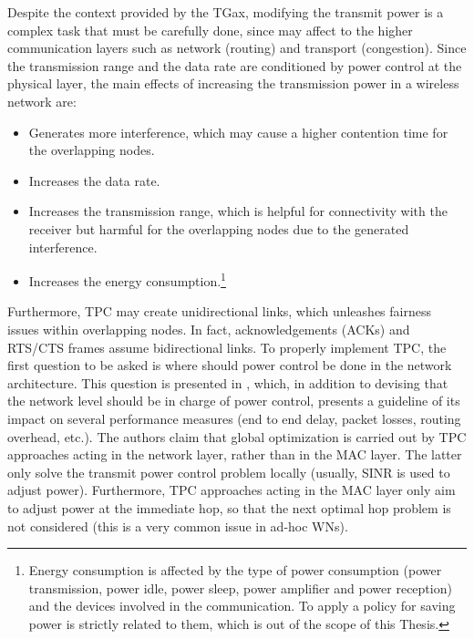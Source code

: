 \documentclass[12pt, a4paper,twoside]{tesi_upf}
\begin{document}
				Despite the context provided by the TGax, modifying the transmit power is a complex task that must be carefully done, since may affect to the higher communication layers such as network (routing) and transport (congestion). Since the transmission range and the data rate are conditioned by power control at the physical layer, the main effects of increasing the transmission power in a wireless network are:
				\begin{itemize}
					\item Generates more interference, which may cause a higher contention time for the overlapping nodes.
					\item Increases the data rate.
					\item Increases the transmission range, which is helpful for connectivity with the receiver but harmful for the overlapping nodes due to the generated interference.
					\item Increases the energy consumption.\footnote{Energy consumption is affected by the type of power consumption (power transmission, power idle, power sleep, power amplifier and power reception) and the devices involved in the communication. To apply a policy for saving power is strictly related to them, which is out of the scope of this Thesis.}
				\end{itemize}
				
				Furthermore, TPC may create unidirectional links, which unleashes fairness issues within overlapping nodes. In fact, acknowledgements (ACKs) and RTS/CTS frames assume bidirectional links. To properly implement TPC, the first question to be asked is where should power control be done in the network architecture. This question is presented in \cite{kawadia2005principles}, which, in addition to devising that the network level should be in charge of power control, presents a guideline of its impact on several performance measures (end to end delay, packet losses, routing overhead, etc.). The authors claim that global optimization is carried out by TPC approaches acting in the network layer, rather than in the MAC layer. The latter only solve the transmit power control problem locally (usually, SINR is used to adjust power). Furthermore, TPC approaches acting in the MAC layer only aim to adjust power at the immediate hop, so that the next optimal hop problem is not considered (this is a very common issue in ad-hoc WNs).
				
\end{document}
